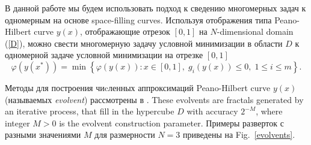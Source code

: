 \documentclass[
11pt,%
tightenlines,%
twoside,%
onecolumn,%
nofloats,%
nobibnotes,%
nofootinbib,%
superscriptaddress,%
noshowpacs,%
centertags]%
{revtex4}
\begin{document}
В данной работе мы будем использовать подход к сведению многомерных задач к одномерным на основе space-filling curves. 
Используя отображения типа Peano-Hilbert curve $y(x)$, отображающие отрезок $[0,1]$ на $N$-dimensional domain (\ref{D}),
можно свести многомерную задачу условной минимизации в области $D$ к одномерной задаче условной минимизации на отрезке $[0,1]$
\begin{equation}\label{problem1}
\varphi(y(x^\ast))=\min \left\{\varphi(y(x)): x \in [0,1], \; g_i(y(x))\leq 0, \; 1 \leq i \leq m\right\}.
\end{equation}

Методы для построения чиcленных аппроксимаций Peano-Hilbert curve $y(x)$ (называемых \textit{evolvent}) рассмотрены в \cite{Sergeyev2013}. These evolvents are fractals generated by an iterative process, that fill in the hypercube $D$ with accuracy $2^{-M}$, where integer $M>0$ is the evolvent construction parameter. 
Примеры разверток с разными значениями $M$  для размерности $N=3$ приведены на Fig.~\ref{evolvents}.
\end{document}
